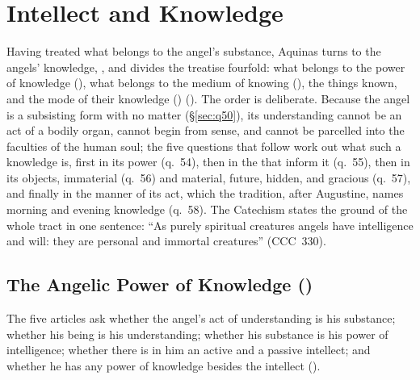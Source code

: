 \section{Intellect and Knowledge}\label{sec:knowledge}

Having treated what belongs to the angel's substance, Aquinas turns to
the angels' knowledge, , and
divides the treatise fourfold: what belongs to the power of knowledge
(), what belongs to the medium of knowing
(), the things known, and the mode of their
knowledge () (). The
order is deliberate. Because the angel is a subsisting form with no matter
(\S\ref{sec:q50}), its understanding cannot be an act of a bodily organ,
cannot begin from sense, and cannot be parcelled into the faculties of the
human soul; the five questions that follow work out what such a knowledge
is, first in its power (q.~54), then in the 
that inform it (q.~55), then in its objects, immaterial (q.~56) and
material, future, hidden, and gracious (q.~57), and finally in the manner
of its act, which the tradition, after Augustine, names morning and
evening knowledge (q.~58). The Catechism states the ground of the whole
tract in one sentence: ``As purely spiritual creatures angels have
intelligence and will: they are personal and immortal creatures''
(CCC~330).

\subsection{The Angelic Power of Knowledge ()}\label{sec:q54}

The five articles ask whether the angel's act of understanding is his
substance; whether his being is his understanding; whether his substance
is his power of intelligence; whether there is in him an active and a
passive intellect; and whether he has any power of knowledge besides the
intellect ().

